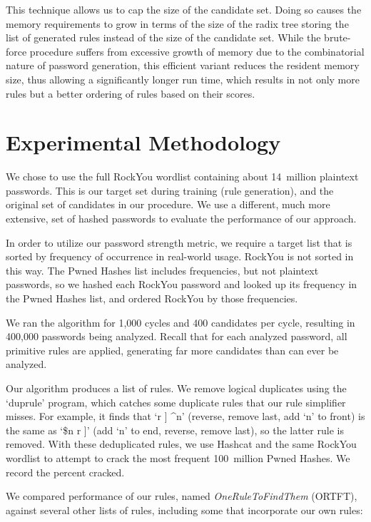 \documentclass{article}
\begin{document}
This technique allows us to cap the size of the candidate set. Doing so causes
the memory requirements to grow in terms of the size of the radix tree storing
the list of generated rules instead of the size of the candidate set. While the
brute-force procedure suffers from excessive growth of memory due to the
combinatorial nature of password generation, this efficient variant reduces
the resident memory size, thus allowing a significantly longer run time, which
results in not only more rules but a better ordering of rules based on their
scores.

\section{Experimental Methodology}
\label{sec:methodology}

We chose to use the full RockYou wordlist containing about 14~million plaintext
passwords. This is our target set during training (rule generation), and the original set of candidates in our procedure. We use a different, much more extensive, set of hashed passwords to evaluate the performance of our approach.

In order
to utilize our password strength metric, we require a target list that is
sorted by frequency of occurrence in real-world usage. RockYou is not sorted in
this way. The Pwned Hashes list\autocite{pwned} includes
frequencies, but not plaintext
passwords, so we hashed each
RockYou password and looked up its frequency in the Pwned Hashes list, and
ordered RockYou by those frequencies.

We ran the algorithm for 1,000 cycles and 400 candidates per cycle, resulting
in 400,000 passwords being analyzed. Recall that for each analyzed password,
all primitive rules are applied, generating far more candidates than can ever
be analyzed.

Our algorithm produces a list of rules. We remove logical duplicates using the
`duprule' program\autocite{duprule}, which catches some duplicate rules that our
rule simplifier misses. For example, it finds that `r ] \^{}n' (reverse, remove
last, add `n' to front) is the same as `\$n r ]' (add `n' to end, reverse,
remove last), so the latter rule is removed. With these deduplicated rules, we
use Hashcat and the same RockYou wordlist to attempt to crack the most frequent
100~million Pwned Hashes\autocite{pwned}. We record the percent cracked.

We compared performance of our rules, named \textit{OneRuleToFindThem} (ORTFT),
against several other lists of rules,
including some that incorporate our own rules:
\end{document}
